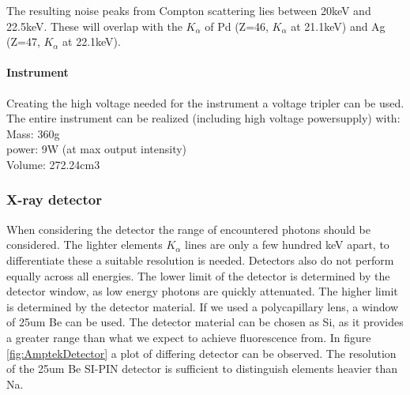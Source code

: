 The resulting noise peaks from Compton scattering lies between 20keV and 22.5keV. These will overlap with the $K_\alpha$ of Pd (Z=46, $K_\alpha$ at 21.1keV) and Ag (Z=47, $K_\alpha$ at 22.1keV).

\paragraph{Instrument}
Creating the high voltage needed for the instrument a voltage tripler can be used. The entire instrument can be realized (including high voltage powersupply) with\citep{AmptekSource}:\\
Mass: 360g\\
power: 9W (at max output intensity)\\
Volume: 272.24cm3

\subsubsection{X-ray detector}
When considering the detector the range of encountered photons should be considered. The lighter elements $K_\alpha$ lines are only a few hundred keV apart, to differentiate these a suitable resolution is needed. Detectors also do not perform equally across all energies. The lower limit of the detector is determined by the detector window, as low energy photons are quickly attenuated. The higher limit is determined by the detector material. If we used a polycapillary lens, a window of 25um Be can be used. The detector material can be chosen as Si, as it provides a greater range than what we expect to achieve fluorescence from. In figure \ref{fig:AmptekDetector} a plot of differing detector can be observed. The resolution of the 25um Be SI-PIN detector is sufficient to distinguish elements heavier than Na.


